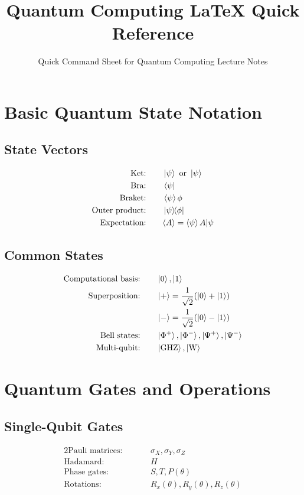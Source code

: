 \documentclass[12pt]{article}
\title{\textbf{\Large Quantum Computing LaTeX Quick Reference}}
\author{Quick Command Sheet for Quantum Computing Lecture Notes}
\date{}
\newcommand{\expectation}[1]{\langle#1\rangle}
\newcommand{\qzero}{\ket{0}}
\newcommand{\qone}{\ket{1}}
\newcommand{\qplus}{\ket{+}}
\newcommand{\qminus}{\ket{-}}
\newcommand{\qpsi}{\ket{\psi}}
\newcommand{\bellphi}{\ket{\Phi^+}}
\newcommand{\bellphim}{\ket{\Phi^-}}
\newcommand{\bellpsi}{\ket{\Psi^+}}
\newcommand{\bellpsim}{\ket{\Psi^-}}
\newcommand{\GHZ}{\ket{\text{GHZ}}}
\newcommand{\Wstate}{\ket{\text{W}}}
\newcommand{\pauliX}{\sigma_X}
\newcommand{\pauliY}{\sigma_Y}
\newcommand{\pauliZ}{\sigma_Z}
\newcommand{\hadamard}{H}
\newcommand{\rx}[1]{R_x(#1)}
\newcommand{\ry}[1]{R_y(#1)}
\newcommand{\rz}[1]{R_z(#1)}
\newcommand{\phaseS}{S}
\newcommand{\phaseT}{T}
\newcommand{\phaseP}[1]{P(#1)}
\theoremstyle{definition}
\theoremstyle{remark}
\begin{document}
\maketitle
\thispagestyle{fancy}


\section{Basic Quantum State Notation}

\subsection{State Vectors}
\begin{alignat}{2}
\text{Ket:}          &\quad && \ket{\psi} \text{ or } \qpsi \\
\text{Bra:}          &\quad && \bra{\psi} \\
\text{Braket:}       &\quad && \braket{\psi}{\phi} \\
\text{Outer product:}&\quad && \ketbra{\psi}{\phi} \\
\text{Expectation:}  &\quad && \expectation{A} = \braket{\psi}{A|\psi}
\end{alignat}

\subsection{Common States}
\begin{alignat}{2}
\text{Computational basis:} &\quad && \qzero, \qone \\
\text{Superposition:}       &\quad && \qplus = \frac{1}{\sqrt{2}}(\qzero + \qone) \\
                             &\quad && \qminus = \frac{1}{\sqrt{2}}(\qzero - \qone) \\
\text{Bell states:}         &\quad && \bellphi, \bellphim, \bellpsi, \bellpsim \\
\text{Multi-qubit:}         &\quad && \GHZ, \Wstate
\end{alignat}


\section{Quantum Gates and Operations}

\subsection{Single-Qubit Gates}
\begin{alignat}{2}
\text{Pauli matrices:} &\quad && \pauliX, \pauliY, \pauliZ \\
\text{Hadamard:}       &\quad && \hadamard \\
\text{Phase gates:}    &\quad && \phaseS, \phaseT, \phaseP{\theta} \\
\text{Rotations:}      &\quad && \rx{\theta}, \ry{\theta}, \rz{\theta}
\end{alignat}
\end{document}
